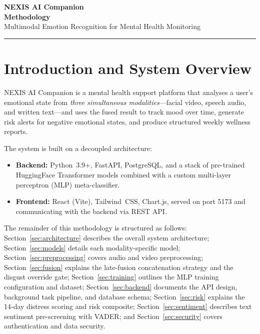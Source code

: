 \documentclass[12pt,a4paper]{article}
\begin{document}
\begin{center}
  {\LARGE \textbf{NEXIS AI Companion}}\\[6pt]
  {\large \textbf{Methodology}}\\[4pt]
  {\normalsize Multimodal Emotion Recognition for Mental Health Monitoring}\\[2pt]
  \rule{\linewidth}{0.4pt}
\end{center}

\tableofcontents
\newpage

\section{Introduction and System Overview}
\label{sec:intro}

NEXIS AI Companion is a mental health support platform that analyses a user's
emotional state from \textit{three simultaneous modalities}—facial video,
speech audio, and written text—and uses the fused result to track mood over
time, generate risk alerts for negative emotional states, and produce
structured weekly wellness reports.

The system is built on a decoupled architecture:

\begin{itemize}[leftmargin=1.5em]
  \item \textbf{Backend:} Python~3.9+, FastAPI, PostgreSQL, and a stack of
        pre-trained HuggingFace Transformer models combined with a custom
        multi-layer perceptron (MLP) meta-classifier.
  \item \textbf{Frontend:} React (Vite), Tailwind~CSS, Chart.js, served on
        port 5173 and communicating with the backend via REST API.
\end{itemize}

The remainder of this methodology is structured as follows:
Section~\ref{sec:architecture} describes the overall system architecture;
Section~\ref{sec:models} details each modality-specific model;
Section~\ref{sec:preprocessing} covers audio and video preprocessing;
Section~\ref{sec:fusion} explains the late-fusion concatenation strategy and
the disgust override gate;
Section~\ref{sec:training} outlines the MLP training configuration and
dataset;
Section~\ref{sec:backend} documents the API design, background task pipeline,
and database schema;
Section~\ref{sec:risk} explains the 14-day distress scoring and risk
composite;
Section~\ref{sec:sentiment} describes text sentiment pre-screening with
VADER; and
Section~\ref{sec:security} covers authentication and data security.
\end{document}
